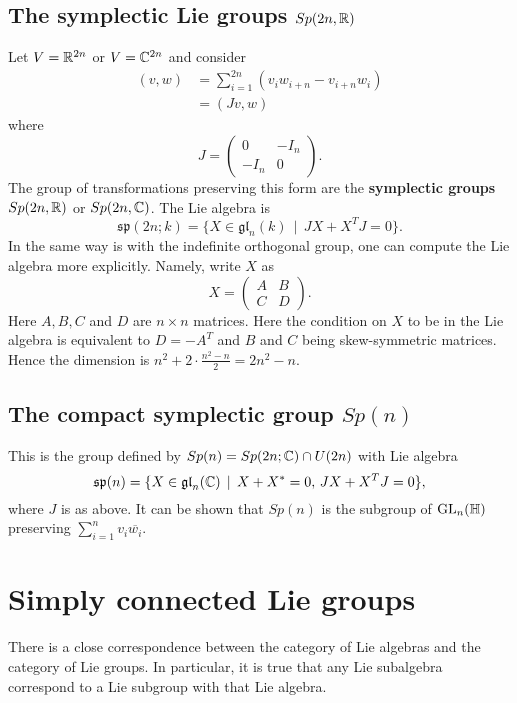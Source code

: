 \documentclass[11pt, english]{article}
\begin{document}
\subsection{The symplectic Lie groups $Sp(2n,\mathbb{R})$}

Let $V= \mathbb{R}^{2n}$ or $V= \mathbb{C}^{2n}$ and consider
\begin{align*}
  (v,w) &= \sum_{i=1}^{2n} (v_i w_{i+n}-v_{i+n}w_i) \\
&= (Jv,w)
\end{align*}
where
$$
J =
\begin{pmatrix}
  0 & -I_n \\
-I_n & 0 
\end{pmatrix}.
$$
The group of transformations preserving this form are the \textbf{symplectic groups} $Sp(2n,\mathbb{R})$ or $Sp(2n,\mathbb{C})$. The Lie algebra is
$$
\mathfrak{sp}(2n;k) = \{ X \in \mathfrak{gl}_n(k) \, \mid \, JX+X^TJ = 0 \}.
$$
In the same way is with the indefinite orthogonal group, one can compute the Lie algebra more explicitly. Namely, write $X$ as 
$$
X =
\begin{pmatrix}
  A & B \\
C & D
\end{pmatrix}.
$$
Here $A,B,C$ and $D$ are $n \times n$ matrices. Here the condition on $X$ to be in the Lie algebra is equivalent to $D=-A^T$ and $B$ and $C$ being skew-symmetric matrices. Hence the dimension is $n^2+2 \cdot \frac{n^2-n}{2} = 2n^2-n$.

\subsection{The compact symplectic group $Sp(n)$} 

This is the group defined by $Sp(n) = Sp(2n; \mathbb{C}) \cap U(2n)$ with Lie algebra
$$
\mathfrak{sp}(n) = \{ X \in \mathfrak{gl}_n(\mathbb{C}) \, \mid \, X+X^*=0, \, JX+X^TJ = 0\},
$$
where $J$ is as above. It can be shown that $Sp(n)$ is the subgroup of $\operatorname{GL}_n(\mathbb H)$ preserving $\sum_{i=1}^n v_i \overline{w_i}$. 

\newpage
\section{Simply connected Lie groups}

There is a close correspondence between the category of Lie algebras and the category of Lie groups. In particular, it is true that any Lie subalgebra correspond to a Lie subgroup with that Lie algebra.
\end{document}
